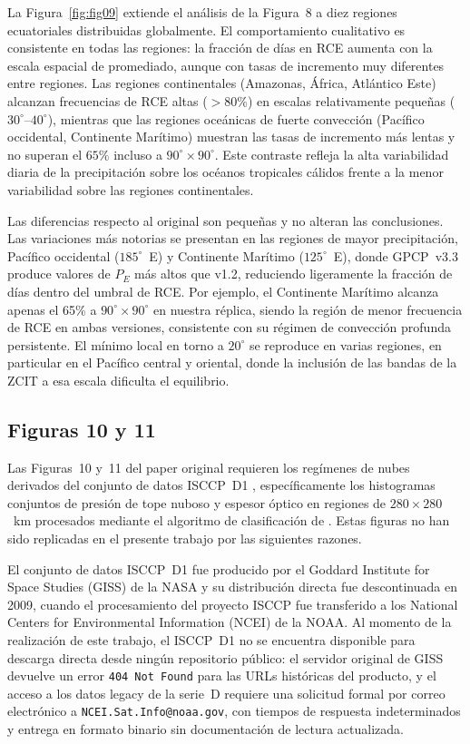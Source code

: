 \documentclass[12pt, a4paper]{article}
\begin{document}
La Figura~\ref{fig:fig09} extiende el análisis de la Figura~8 a diez regiones
ecuatoriales distribuidas globalmente. El comportamiento cualitativo es consistente
en todas las regiones: la fracción de días en RCE aumenta con la escala espacial de
promediado, aunque con tasas de incremento muy diferentes entre regiones. Las regiones
continentales (Amazonas, África, Atlántico Este) alcanzan frecuencias de RCE altas
($>80\%$) en escalas relativamente pequeñas ($30^\circ$--$40^\circ$), mientras que
las regiones oceánicas de fuerte convección (Pacífico occidental, Continente Marítimo)
muestran las tasas de incremento más lentas y no superan el $65\%$ incluso a
$90^\circ \times 90^\circ$. Este contraste refleja la alta variabilidad diaria de
la precipitación sobre los océanos tropicales cálidos frente a la menor variabilidad
sobre las regiones continentales.

Las diferencias respecto al original son pequeñas y no alteran las conclusiones.
Las variaciones más notorias se presentan en las regiones de mayor precipitación, Pacífico occidental ($185^\circ$~E) y Continente Marítimo ($125^\circ$~E), donde
GPCP~v3.3 produce valores de $P_E$ más altos que v1.2, reduciendo ligeramente la
fracción de días dentro del umbral de RCE. Por ejemplo, el Continente Marítimo
alcanza apenas el 65\% a $90^\circ \times 90^\circ$ en nuestra réplica, siendo la
región de menor frecuencia de RCE en ambas versiones, consistente con su régimen de
convección profunda persistente. El mínimo local en torno a $20^\circ$ se reproduce
en varias regiones, en particular en el Pacífico central y oriental, donde la inclusión
de las bandas de la ZCIT a esa escala dificulta el equilibrio.

\subsection{Figuras 10 y 11}

Las Figuras~10 y~11 del paper original requieren los regímenes de nubes derivados
del conjunto de datos ISCCP~D1 \citep{rossow1991}, específicamente los histogramas
conjuntos de presión de tope nuboso y espesor óptico en regiones de
$280 \times 280$~km procesados mediante el algoritmo de clasificación de
\cite{jakob2003}. Estas figuras no han sido replicadas en el presente trabajo por
las siguientes razones.

El conjunto de datos ISCCP~D1 fue producido por el Goddard Institute for Space
Studies (GISS) de la NASA y su distribución directa fue descontinuada en 2009,
cuando el procesamiento del proyecto ISCCP fue transferido a los National Centers
for Environmental Information (NCEI) de la NOAA. Al momento de la realización de
este trabajo, el ISCCP~D1 no se encuentra disponible para descarga directa desde
ningún repositorio público: el servidor original de GISS devuelve un error
\texttt{404 Not Found} para las URLs históricas del producto, y el acceso a los
datos legacy de la serie~D requiere una solicitud formal por correo electrónico a
\texttt{NCEI.Sat.Info@noaa.gov}, con tiempos de respuesta indeterminados y entrega
en formato binario sin documentación de lectura actualizada.
\end{document}
